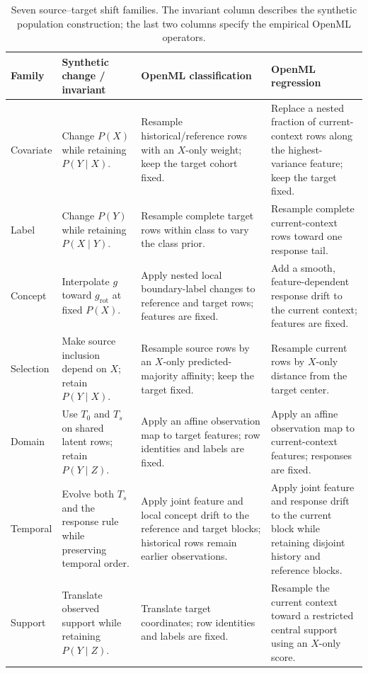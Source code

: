 \begin{table}[H]
  \caption{Seven source--target shift families.  The invariant column describes
  the synthetic population construction; the last two columns specify the
  empirical OpenML operators.}
  \label{tab:shift-transformations}
  \centering
  \scriptsize
  \setlength{\tabcolsep}{2.5pt}
  \begin{tabular}{@{}>{\raggedright\arraybackslash}p{}
                      >{\raggedright\arraybackslash}p{}
                      >{\raggedright\arraybackslash}p{}
                      >{\raggedright\arraybackslash}p{}@{}}
    \toprule
    Family & Synthetic change / invariant & OpenML classification & OpenML regression \\
    \midrule
    Covariate
      & Change $P(X)$ while retaining $P(Y\mid X)$.
      & Resample historical/reference rows with an $X$-only weight; keep the
        target cohort fixed.
      & Replace a nested fraction of current-context rows along the
        highest-variance feature; keep the target fixed. \\
    Label
      & Change $P(Y)$ while retaining $P(X\mid Y)$.
      & Resample complete target rows within class to vary the class prior.
      & Resample complete current-context rows toward one response tail. \\
    Concept
      & Interpolate $g$ toward $g_{\mathrm{rot}}$ at fixed $P(X)$.
      & Apply nested local boundary-label changes to reference and target rows;
        features are fixed.
      & Add a smooth, feature-dependent response drift to the current context;
        features are fixed. \\
    Selection
      & Make source inclusion depend on $X$; retain $P(Y\mid X)$.
      & Resample source rows by an $X$-only predicted-majority affinity; keep
        the target fixed.
      & Resample current rows by $X$-only distance from the target center. \\
    Domain
      & Use $T_0$ and $T_s$ on shared latent rows; retain $P(Y\mid Z)$.
      & Apply an affine observation map to target features; row identities and
        labels are fixed.
      & Apply an affine observation map to current-context features; responses
        are fixed. \\
    Temporal
      & Evolve both $T_s$ and the response rule while preserving temporal order.
      & Apply joint feature and local concept drift to the reference and target
        blocks; historical rows remain earlier observations.
      & Apply joint feature and response drift to the current block while
        retaining disjoint history and reference blocks. \\
    Support
      & Translate observed support while retaining $P(Y\mid Z)$.
      & Translate target coordinates; row identities and labels are fixed.
      & Resample the current context toward a restricted central support using
        an $X$-only score. \\
    \bottomrule
  \end{tabular}
\end{table}

